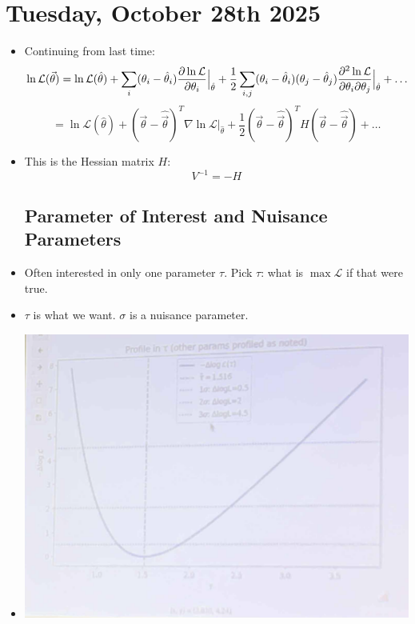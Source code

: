 \section{Tuesday, October 28th 2025}

\begin{itemize}

      \subsection{Taylor Expansion of the Log-Likelihood Around the Maximum}
      \item Continuing from last time:
            \[
                  \ln \mathcal{L}(\vec{\theta}) = \ln \mathcal{L}(\hat{\theta}) +  \sum_{i} (\theta_i-\hat{\theta}_i) \pdv{\ln \mathcal{L}}{\theta_i} \Big|_{\hat{\theta}} + \frac{1}{2} \sum_{i,j} (\theta_i-\hat{\theta}_i)(\theta_j-\hat{\theta}_j) \pdv[2]{\ln \mathcal{L}}{\theta_i}{\theta_j} \Big|_{\hat{\theta}} + \ldots
            \]
            \[
                  = \ln \mathcal{L}(\hat{\theta}) + (\vec{\theta} - \hat{\vec{\theta}})^T \nabla \ln \mathcal{L} \Big|_{\hat{\theta}}  + \frac{1}{2} (\vec{\theta} - \hat{\vec{\theta}})^T H (\vec{\theta} - \hat{\vec{\theta}}) + \ldots
            \]
      \item This is the Hessian matrix $H$:
            \[
                  V^{-1} = - H
            \]

            \subsection{Parameter of Interest and Nuisance Parameters}
      \item Often interested in only one parameter $\tau$. Pick $\tau$: what is $\max \mathcal{L}$ if that were true.
      \item $\tau$ is what we want. $\sigma$ is a nuisance parameter.
      \item
            \includegraphics[width = 0.5\linewidth]{Images/lec14-tau-likelihood.png}


\end{itemize}
